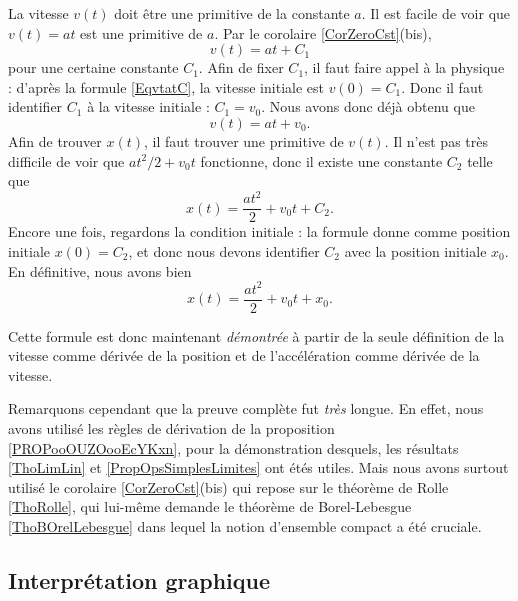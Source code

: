 La vitesse \( v(t)\) doit être une primitive de la constante \( a\). Il est facile de voir que \( v(t)=at\) est une primitive de \( a\). Par le corolaire \ref{CorZeroCst}(bis),
\begin{equation}    \label{EqvtatC}
	v(t)=at+C_1
\end{equation}
pour une certaine constante \( C_1\). Afin de fixer \( C_1\), il faut faire appel à la physique : d'après la formule \eqref{EqvtatC}, la vitesse initiale est \( v(0)=C_1\). Donc il faut identifier \( C_1\) à la vitesse initiale : \( C_1=v_0\). Nous avons donc déjà obtenu que
\begin{equation}
	v(t)=at+v_0.
\end{equation}
Afin de trouver \( x(t)\), il faut trouver une primitive de \( v(t)\). Il n'est pas très difficile de voir que \( at^2/2 + v_0t\) fonctionne, donc il existe une constante \( C_2\) telle que
\begin{equation}
	x(t)=\frac{ at^2 }{ 2 }+v_0t+C_2.
\end{equation}
Encore une fois, regardons la condition initiale : la formule donne comme position initiale \( x(0)=C_2\), et donc nous devons identifier \( C_2\) avec la position initiale \( x_0\). En définitive, nous avons bien
\begin{equation}
	x(t) = \frac{ at^2 }{ 2 } + v_0t +x_0.
\end{equation}

Cette formule est donc maintenant \emph{démontrée} à partir de la seule définition de la vitesse comme dérivée de la position et de l'accélération comme dérivée de la vitesse.

Remarquons cependant que la preuve complète fut \emph{très} longue. En effet, nous avons utilisé les règles de dérivation de la proposition \ref{PROPooOUZOooEcYKxn}, pour la démonstration desquels, les résultats \ref{ThoLimLin} et \ref{PropOpsSimplesLimites} ont étés utiles. Mais nous avons surtout utilisé le corolaire \ref{CorZeroCst}(bis) qui repose sur le théorème de Rolle \ref{ThoRolle}, qui lui-même demande le théorème de Borel-Lebesgue \ref{ThoBOrelLebesgue} dans lequel la notion d'ensemble compact a été cruciale.

\subsection{Interprétation graphique}

